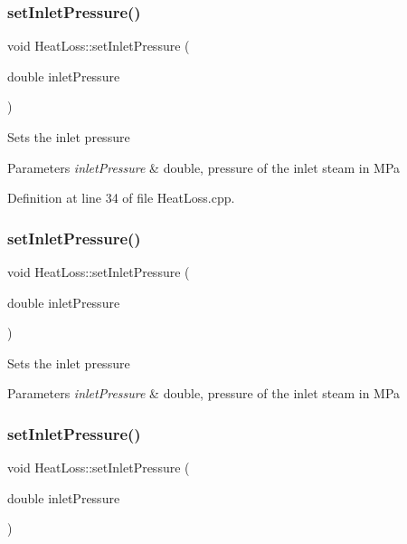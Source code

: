 \subsubsection{\texorpdfstring{set\+Inlet\+Pressure()}{setInletPressure()}\hspace{0.1cm}{\footnotesize\ttfamily [1/3]}}
{\footnotesize\ttfamily void Heat\+Loss\+::set\+Inlet\+Pressure (\begin{DoxyParamCaption}\item[{double}]{inlet\+Pressure }\end{DoxyParamCaption})}

Sets the inlet pressure 
\begin{DoxyParams}{Parameters}
{\em inlet\+Pressure} & double, pressure of the inlet steam in M\+Pa \\
\hline
\end{DoxyParams}


Definition at line 34 of file Heat\+Loss.\+cpp.

\mbox{\label{class_heat_loss_ab0a6b1f2a964d161d25758318f25f7e3}} 
\subsubsection{\texorpdfstring{set\+Inlet\+Pressure()}{setInletPressure()}\hspace{0.1cm}{\footnotesize\ttfamily [2/3]}}
{\footnotesize\ttfamily void Heat\+Loss\+::set\+Inlet\+Pressure (\begin{DoxyParamCaption}\item[{double}]{inlet\+Pressure }\end{DoxyParamCaption})}

Sets the inlet pressure 
\begin{DoxyParams}{Parameters}
{\em inlet\+Pressure} & double, pressure of the inlet steam in M\+Pa \\
\hline
\end{DoxyParams}
\mbox{\label{class_heat_loss_ab0a6b1f2a964d161d25758318f25f7e3}} 
\subsubsection{\texorpdfstring{set\+Inlet\+Pressure()}{setInletPressure()}\hspace{0.1cm}{\footnotesize\ttfamily [3/3]}}
{\footnotesize\ttfamily void Heat\+Loss\+::set\+Inlet\+Pressure (\begin{DoxyParamCaption}\item[{double}]{inlet\+Pressure }\end{DoxyParamCaption})}

